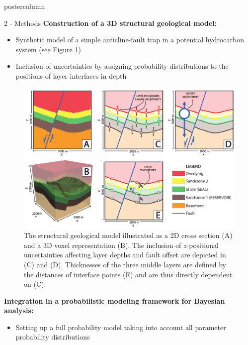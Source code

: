 \documentclass{beamer}
\begin{document}
\begin{frame}
\begin{columns}
\begin{column}{.249\textwidth}
\begin{beamercolorbox}[center]{postercolumn}
\begin{minipage}{.98\textwidth}
{\begin{myblock}{2 - Methods}
\textbf{Construction of a 3D structural geological model:}
	\begin{itemize}
	\item Synthetic model of a simple anticline-fault trap in a potential hydrocarbon system (see Figure \ref{fig:unc_lik})
	\item Inclusion of uncertainties by assigning probability distributions to the positions of layer interfaces in depth
	\end{itemize}							
								\vspace{0.5em}
								\begin{figure}
									\begin{minipage}{0.95\textwidth}
										\centering\includegraphics[width=1\textwidth]{figures/Uncertainties_Likelihoods.pdf}
										\caption{The structural geological model illustrated as a 2D cross section (A) and a 3D voxel representation (B). The inclusion of $z$-positional uncertainties affecting layer depths and fault offset are depicted in (C) and (D). Thicknesses of the three middle layers are defined by the distances of interface points (E) and are thus directly dependent on (C).}
										\label{fig:unc_lik}
									\end{minipage}
								\end{figure}
\textbf{Integration in a probabilistic modeling framework for Bayesian analysis:}
	\begin{itemize}
	\item Setting up a full probability model taking into account all parameter probability distributions

\end{itemize}
\end{myblock}}
\end{minipage}
\end{beamercolorbox}
\end{column}
\end{columns}
\end{frame}
\end{document}
